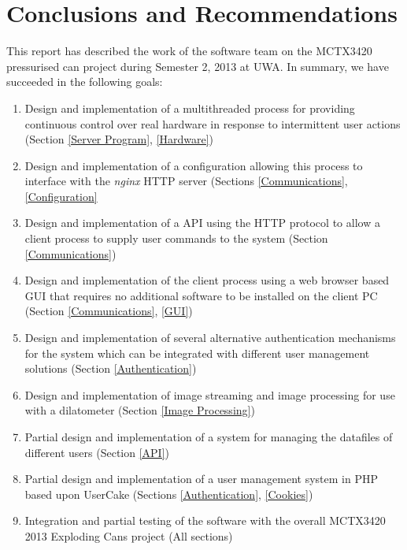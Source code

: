 \chapter{Conclusions and Recommendations}

This report has described the work of the software team on the MCTX3420 pressurised can project during Semester 2, 2013 at UWA.
In summary, we have succeeded in the following goals:

\begin{enumerate}
	\item Design and implementation of a multithreaded process for providing continuous control over real hardware in response to intermittent user actions (Section \ref{Server Program}, \ref{Hardware})
	\item Design and implementation of a configuration allowing this process to interface with the \emph{nginx} HTTP server (Sections \ref{Communications}, \ref{Configuration}
	\item Design and implementation of a API using the HTTP protocol to allow a client process to supply user commands to the system (Section \ref{Communications})
	\item Design and implementation of the client process using a web browser based GUI that requires no additional software to be installed on the client PC (Section \ref{Communications}, \ref{GUI})
	\item Design and implementation of several alternative authentication mechanisms for the system which can be integrated with different user management solutions (Section \ref{Authentication})
	\item Design and implementation of image streaming and image processing for use with a dilatometer (Section \ref{Image Processing})
	\item Partial design and implementation of a system for managing the datafiles of different users (Section \ref{API})
	\item Partial design and implementation of a user management system in PHP based upon UserCake (Sections \ref{Authentication}, \ref{Cookies})
	\item Integration and partial testing of the software with the overall MCTX3420 2013 Exploding Cans project (All sections)
\end{enumerate}

